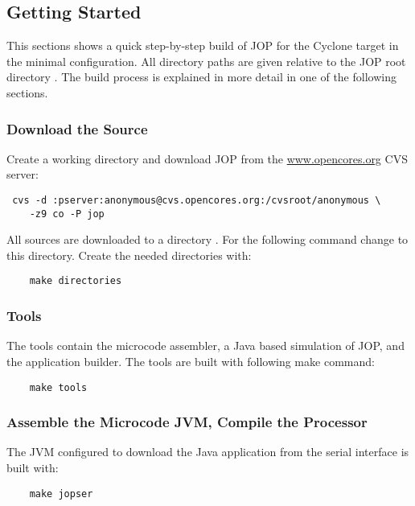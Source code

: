 \subsection{Getting Started}

This sections shows a quick step-by-step build of JOP for the
Cyclone target in the minimal configuration. All directory paths are
given relative to the JOP root directory . The build
process is explained in more detail in one of the following
sections.

\subsubsection{Download the Source}

Create a working directory and download JOP from the
\url{www.opencores.org} CVS server:

\begin{verbatim}
 cvs -d :pserver:anonymous@cvs.opencores.org:/cvsroot/anonymous \
    -z9 co -P jop
\end{verbatim}

All sources are downloaded to a directory . For the
following command change to this directory. Create the needed
directories with:
\begin{verbatim}
    make directories
\end{verbatim}

\subsubsection{Tools}

The tools contain  the microcode assembler,  a
Java based simulation of JOP, and \cmd{JOPizer} the application
builder. The tools are built with following make command:

\begin{verbatim}
    make tools
\end{verbatim}

\subsubsection{Assemble the Microcode JVM, Compile the Processor}

The JVM configured to download the Java application from the serial
interface is built with:

\begin{verbatim}
    make jopser
\end{verbatim}

